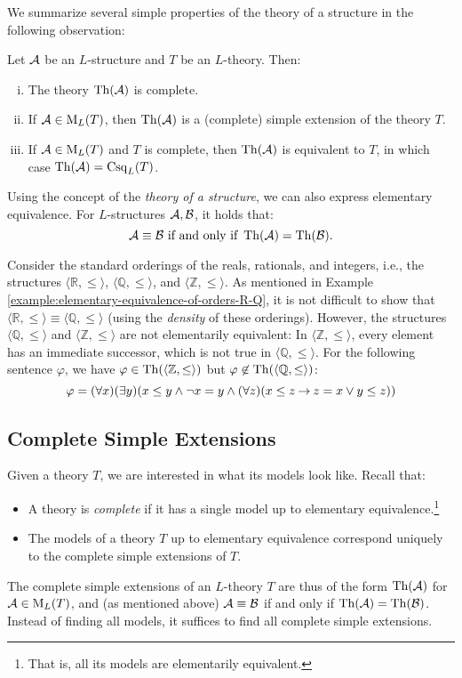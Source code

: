 We summarize several simple properties of the theory of a structure in the following observation:

\begin{observation}
    Let $\mathcal{A}$ be an $L$-structure and $T$ be an $L$-theory. Then:
    \begin{enumerate}[(i)]
        \item The theory $\operatorname{Th}(\mathcal{A})$ is complete.
        \item If $\mathcal{A}\in\operatorname{M}_L(T)$, then $\operatorname{Th}(\mathcal{A})$ is a (complete) simple extension of the theory $T$.
        \item If $\mathcal{A}\in\operatorname{M}_L(T)$ and $T$ is complete, then $\operatorname{Th}(\mathcal{A})$ is equivalent to $T$, in which case $\operatorname{Th}(\mathcal{A})=\operatorname{Csq}_L(T)$.
    \end{enumerate}    
\end{observation}

Using the concept of the \emph{theory of a structure}, we can also express elementary equivalence. For $L$-structures $\mathcal{A},\mathcal{B}$, it holds that:
$$
\mathcal{A}\equiv\mathcal{B} \text{ if and only if }\operatorname{Th}(\mathcal{A})=\operatorname{Th}(\mathcal{B}).
$$

\begin{example}
   Consider the standard orderings of the reals, rationals, and integers, i.e., the structures $\langle\mathbb{R},\leq\rangle$, $\langle\mathbb{Q},\leq\rangle$, and $\langle\mathbb{Z},\leq\rangle$. As mentioned in Example \ref{example:elementary-equivalence-of-orders-R-Q}, it is not difficult to show that $\langle\mathbb{R},\leq\rangle\equiv\langle\mathbb{Q},\leq\rangle$ (using the \emph{density} of these orderings). However, the structures $\langle\mathbb{Q},\leq\rangle$ and $\langle\mathbb{Z},\leq\rangle$ are not elementarily equivalent: In $\langle\mathbb{Z},\leq\rangle$, every element has an immediate successor, which is not true in $\langle\mathbb{Q},\leq\rangle$. For the following sentence $\varphi$, we have $\varphi\in\operatorname{Th}(\langle\mathbb{Z},\leq\rangle)$ but $\varphi\not\in\operatorname{Th}(\langle\mathbb{Q},\leq\rangle)$:
   $$
   \varphi=(\forall x)(\exists y)(x\leq y \land \neg x=y \land (\forall z)(x\leq z \mathbin{\rightarrow} z=x\lor y\leq z))
   $$
\end{example}

\subsection{Complete Simple Extensions}

Given a theory $T$, we are interested in what its models look like. Recall that:
\begin{itemize}
    \item A theory is \emph{complete} if it has a single model up to elementary equivalence.\footnote{That is, all its models are elementarily equivalent.}
    \item The models of a theory $T$ up to elementary equivalence correspond uniquely to the complete simple extensions of $T$.
\end{itemize}
The complete simple extensions of an $L$-theory $T$ are thus of the form $\operatorname{Th}(\mathcal{A})$ for $\mathcal{A}\in\operatorname{M}_L(T)$, and (as mentioned above) $\mathcal{A}\equiv\mathcal{B}$ if and only if $\operatorname{Th}(\mathcal{A})=\operatorname{Th}(\mathcal{B})$. Instead of finding all models, it suffices to find all complete simple extensions.

